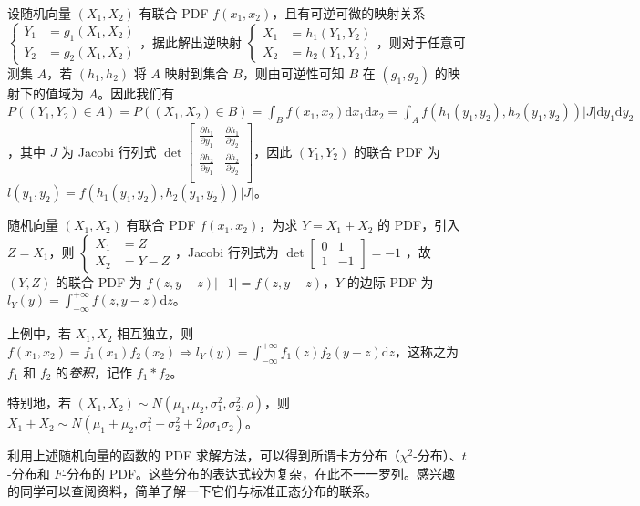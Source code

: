 \documentclass[../main.tex]{subfiles}
\begin{document}
设随机向量 $(X_1,X_2)$ 有联合 PDF $f(x_1,x_2)$，且有可逆可微的映射关系 $
    \left\{\begin{aligned}
        Y_1 & =g_1(X_1,X_2) \\
        Y_2 & =g_2(X_1,X_2)
    \end{aligned}\right.
$，据此解出逆映射 $
    \left\{\begin{aligned}
        X_1 & =h_1(Y_1,Y_2) \\
        X_2 & =h_2(Y_1,Y_2)
    \end{aligned}\right.
$，则对于任意可测集 $A$，若 $(h_1,h_2)$ 将 $A$ 映射到集合 $B$，则由可逆性可知 $B$ 在 $(g_1,g_2)$ 的映射下的值域为 $A$。因此我们有 $P((Y_1,Y_2)\in A)=P((X_1,X_2)\in B)=\int_Bf(x_1,x_2)\mathrm dx_1\mathrm dx_2=\int_Af(h_1(y_1,y_2),h_2(y_1,y_2))|J|\mathrm dy_1\mathrm dy_2$，其中 $J$ 为 Jacobi 行列式 $
    \det \left[\begin{matrix}
            \frac{\partial h_1}{\partial y_1} & \frac{\partial h_1}{\partial y_2} \\
            \frac{\partial h_2}{\partial y_1} & \frac{\partial h_2}{\partial y_2} \\
        \end{matrix}\right]
$，因此 $(Y_1,Y_2)$ 的联合 PDF 为 $l(y_1,y_2)=f(h_1(y_1,y_2),h_2(y_1,y_2))|J|$。

\begin{example}
    随机向量 $(X_1,X_2)$ 有联合 PDF $f(x_1,x_2)$，为求 $Y=X_1+X_2$ 的 PDF，引入 $Z=X_1$，则 $
        \left\{\begin{aligned}
            X_1 & =Z   \\
            X_2 & =Y-Z
        \end{aligned}\right.
    $，Jacobi 行列式为 $
        \det \left[\begin{matrix}
                0 & 1  \\
                1 & -1
            \end{matrix}\right]=-1
    $
    ，故 $(Y,Z)$ 的联合 PDF 为 $f(z,y-z)|-1|=f(z,y-z)$，$Y$ 的边际 PDF 为 $l_Y(y)=\int_{-\infty}^{+\infty}f(z,y-z)\mathrm dz$。
\end{example}

上例中，若 $X_1,X_2$ 相互独立，则 $f(x_1,x_2)=f_1(x_1)f_2(x_2)\Rightarrow l_Y(y)=\int_{-\infty}^{+\infty}f_1(z)f_2(y-z)\mathrm dz$，这称之为 $f_1$ 和 $f_2$ 的\emph{卷积}，记作 $f_1\ast f_2$。

特别地，若 $(X_1,X_2)\sim N(\mu_1,\mu_2,\sigma_1^2,\sigma_2^2,\rho)$，则 $X_1+X_2\sim N(\mu_1+\mu_2,\sigma_1^2+\sigma_2^2+2\rho\sigma_1\sigma_2)$。

利用上述随机向量的函数的 PDF 求解方法，可以得到所谓卡方分布（$\chi^2$-分布）、$t$-分布和 $F$-分布的 PDF。这些分布的表达式较为复杂，在此不一一罗列。感兴趣的同学可以查阅资料，简单了解一下它们与标准正态分布的联系。
\end{document}
